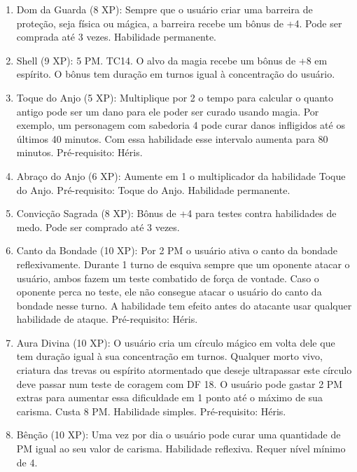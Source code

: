 \begin{enumerate}
	\item Dom da Guarda (8 XP): Sempre que o usuário criar uma barreira de proteção, seja física ou mágica, a barreira recebe um bônus de +4. Pode ser comprada até 3 vezes. Habilidade permanente.
	
		\item Shell (9 XP): 5 PM. TC14.\newline
O alvo da magia recebe um bônus de +8 em espírito. O bônus tem duração em turnos igual à concentração do usuário.
	
	\item Toque do Anjo (5 XP): Multiplique por 2 o tempo para calcular o quanto antigo pode ser um dano para ele poder ser curado usando magia. Por exemplo, um personagem com sabedoria 4 pode curar danos infligidos até os últimos 40 minutos. Com essa habilidade esse intervalo aumenta para 80 minutos. Pré-requisito: Héris.
	
	\item Abraço do Anjo (6 XP): Aumente em 1 o multiplicador da habilidade Toque do Anjo. Pré-requisito: Toque do Anjo. Habilidade permanente.
	
	\item Convicção Sagrada (8 XP): Bônus de +4 para testes contra habilidades de medo. Pode ser comprado até 3 vezes.

	\item Canto da Bondade (10 XP): Por 2 PM o usuário ativa o canto da bondade reflexivamente. Durante 1 turno de esquiva sempre que um oponente atacar o usuário, ambos fazem um teste combatido de força de vontade. Caso o oponente perca no teste, ele não consegue atacar o usuário do canto da bondade nesse turno. A habilidade tem efeito antes do atacante usar qualquer habilidade de ataque. Pré-requisito: Héris.

 		\item Aura Divina (10 XP): O usuário cria um círculo mágico em volta dele que tem duração igual à sua concentração em turnos. Qualquer morto vivo, criatura das trevas ou espírito atormentado que deseje ultrapassar este círculo deve passar num teste de coragem com DF 18. O usuário pode gastar 2 PM extras para aumentar essa dificuldade em 1 ponto até o máximo de sua carisma. Custa 8 PM. Habilidade simples. Pré-requisito: Héris.

\item Bênção (10 XP): Uma vez por dia o usuário pode curar uma quantidade de PM igual ao seu valor de carisma. Habilidade reflexiva. Requer nível mínimo de 4.	


\end{enumerate}
